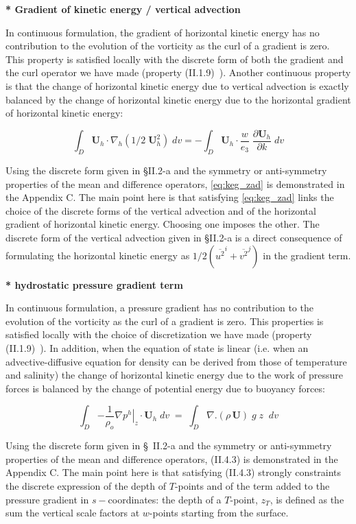 \documentclass[../main/NEMO_manual]{subfiles}
\begin{document}
\textbf{* Gradient of kinetic energy / vertical advection}

In continuous formulation, the gradient of horizontal kinetic energy has no contribution to the evolution of
the vorticity as the curl of a gradient is zero.
This property is satisfied locally with the discrete form of both the gradient and the curl operator we have made
(property (II.1.9)~).
Another continuous property is that the change of horizontal kinetic energy due to
vertical advection is exactly balanced by the change of horizontal kinetic energy due to
the horizontal gradient of horizontal kinetic energy:

\begin{equation} \label{eq:keg_zad}
\int_D {{\textbf{U}}_h \cdot \nabla _h \left( {1/2\;{\textbf{U}}_h ^2} \right)\;dv} =-\int_D {{\textbf{U}}_h \cdot \frac{w}{e_3 }\;\frac{\partial 
{\textbf{U}}_h }{\partial k}\;dv}
\end{equation}

Using the discrete form given in {\S}II.2-a and the symmetry or anti-symmetry properties of
the mean and difference operators, \autoref{eq:keg_zad} is demonstrated in the Appendix C.
The main point here is that satisfying \autoref{eq:keg_zad} links the choice of the discrete forms of
the vertical advection and of the horizontal gradient of horizontal kinetic energy.
Choosing one imposes the other.
The discrete form of the vertical advection given in {\S}II.2-a is a direct consequence of
formulating the horizontal kinetic energy as $1/2 \left( \overline{u^2}^i + \overline{v^2}^j \right) $ in
the gradient term.

\textbf{* hydrostatic pressure gradient term}

In continuous formulation, a pressure gradient has no contribution to the evolution of the vorticity as
the curl of a gradient is zero.
This properties is satisfied locally with the choice of discretization we have made (property (II.1.9)~).
In addition, when the equation of state is linear
(i.e. when an advective-diffusive equation for density can be derived from those of temperature and salinity)
the change of horizontal kinetic energy due to the work of pressure forces is balanced by the change of
potential energy due to buoyancy forces:

\[
  \int_D {-\frac{1}{\rho_o }\left. {\nabla p^h} \right|_z \cdot {\textbf {U}}_h \;dv} \;=\;\int_D {\nabla .\left( {\rho \,{\textbf{U}}} \right)\;g\;z\;\;dv}
\]

Using the discrete form given in {\S}~II.2-a and the symmetry or anti-symmetry properties of
the mean and difference operators, (II.4.3) is demonstrated in the Appendix C.
The main point here is that satisfying (II.4.3) strongly constraints the discrete expression of the depth of 
$T$-points and of the term added to the pressure gradient in $s-$coordinates: the depth of a $T$-point, $z_T$,
is defined as the sum the vertical scale factors at $w$-points starting from the surface.
\end{document}
